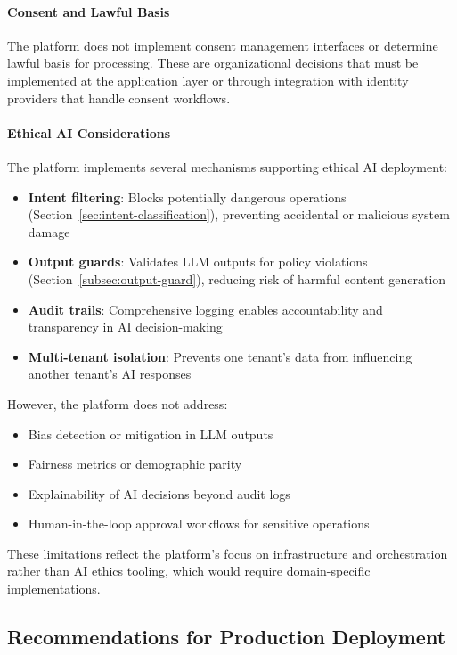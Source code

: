 \documentclass[a4paper,twoside]{sapthesis}
\begin{document}
\paragraph{Consent and Lawful Basis}

The platform does not implement consent management interfaces or determine lawful basis for processing. These are organizational decisions that must be implemented at the application layer or through integration with identity providers that handle consent workflows.

\paragraph{Ethical AI Considerations}

The platform implements several mechanisms supporting ethical AI deployment:
\begin{itemize}
    \item \textbf{Intent filtering}: Blocks potentially dangerous operations (Section~\ref{sec:intent-classification}), preventing accidental or malicious system damage
    \item \textbf{Output guards}: Validates LLM outputs for policy violations (Section~\ref{subsec:output-guard}), reducing risk of harmful content generation
    \item \textbf{Audit trails}: Comprehensive logging enables accountability and transparency in AI decision-making
    \item \textbf{Multi-tenant isolation}: Prevents one tenant's data from influencing another tenant's AI responses
\end{itemize}

However, the platform does not address:
\begin{itemize}
    \item Bias detection or mitigation in LLM outputs
    \item Fairness metrics or demographic parity
    \item Explainability of AI decisions beyond audit logs
    \item Human-in-the-loop approval workflows for sensitive operations
\end{itemize}

These limitations reflect the platform's focus on infrastructure and orchestration rather than AI ethics tooling, which would require domain-specific implementations.

\subsection{Recommendations for Production Deployment}
\label{subsec:security-recommendations}
\end{document}
